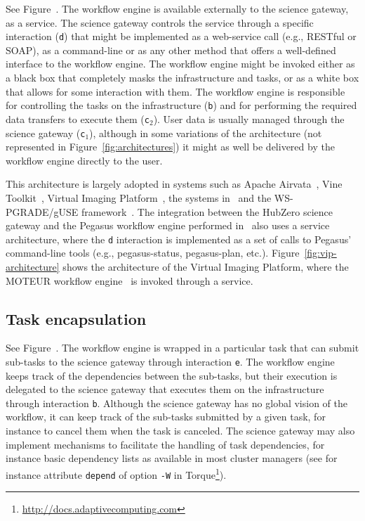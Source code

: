 \documentclass[preprint,3p,twocolumn]{elsarticle}
\begin{document}
See Figure~. The workflow engine is available
externally to the science gateway, as a service. The science gateway
controls the service through a specific interaction (\texttt{d}) that
might be implemented as a web-service call (e.g., RESTful or SOAP), as
a command-line or as any other method that offers a well-defined
interface to the workflow engine. The workflow engine might be invoked
either as a black box that completely masks the infrastructure and
tasks, or as a white box that allows for some interaction with
them. The workflow engine is responsible for controlling the tasks on
the infrastructure (\texttt{b}) and for performing the required data
transfers to execute them (\texttt{c$_2$}). User data is usually
managed through the science gateway (\texttt{c$_1$}), although in some
variations of the architecture (not represented in
Figure~\ref{fig:architectures}) it might as well be delivered by the
workflow engine directly to the user. 

This architecture is largely adopted in systems such as Apache
Airvata~\cite{marru2011apache}, Vine
Toolkit~\cite{DBLP:journals/scpe/SzejnfeldDKKKKLPTWDNW10}, Virtual
Imaging Platform~\cite{GLAT-13}, the systems
in~\cite{wu2010accelerating,shahand:2012jgc} and the WS-PGRADE/gUSE
framework~\cite{Kacsuk2012}. The integration between the
HubZero science gateway and the Pegasus workflow engine performed
in~\cite{CPE:CPE3257} also uses a service architecture, where the
\texttt{d} interaction is implemented as a set of calls to Pegasus'
command-line tools (e.g., pegasus-status, pegasus-plan,
etc.). Figure~\ref{fig:vip-architecture} shows the architecture of the
Virtual Imaging Platform, where the MOTEUR workflow
engine~\cite{GLAT-08i} is invoked through a service.

\subsection{Task encapsulation}

See Figure~. The workflow engine is wrapped in
a particular task that can submit sub-tasks to the science gateway
through interaction \texttt{e}. The workflow engine keeps track of the
dependencies between the sub-tasks, but their execution is delegated
to the science gateway that executes them on the infrastructure
through interaction \texttt{b}. Although the science gateway has no
global vision of the workflow, it can keep track of the sub-tasks
submitted by a given task, for instance to cancel them when
the task is canceled. The science gateway may also implement
mechanisms to facilitate the handling of task dependencies, for
instance basic dependency lists as available in most cluster managers
(see for instance attribute \texttt{depend} of option \texttt{-W} in
Torque\footnote{\url{http://docs.adaptivecomputing.com}}).
\end{document}
